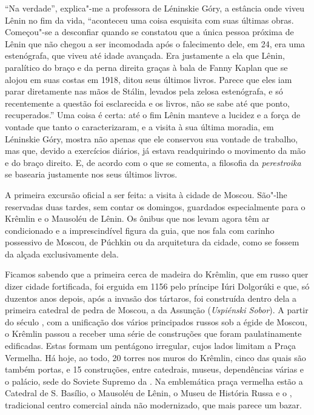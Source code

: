 ``Na verdade'', explica"-me a professora de Léninskie Góry, a estância onde viveu Lênin no fim da vida, ``aconteceu uma coisa esquisita com suas últimas obras. Começou"-se a desconfiar quando se constatou que a única pessoa próxima de Lênin que não chegou a ser incomodada após o falecimento dele, em 24, era uma estenógrafa, que viveu até idade avançada. Era justamente a ela que Lênin, paralítico do braço e da perna direita graças à bala de Fanny Kaplan que se alojou em suas costas em 1918, ditou seus últimos livros. Parece que eles iam parar diretamente nas mãos de Stálin, levados pela zelosa estenógrafa, e só recentemente a questão foi esclarecida e os livros, não se sabe até que ponto, recuperados.'' Uma coisa é certa: até o fim Lênin manteve a lucidez e a força de vontade que tanto o caracterizaram, e a visita à sua última moradia, em Léninskie Góry, mostra não apenas que ele conservou sua vontade de trabalho, mas que, devido a exercícios diários, já estava readquirindo o movimento da mão e do braço direito. E, de acordo com o que se comenta, a filosofia da \emph{perestroika} se basearia justamente nos seus últimos livros.

A primeira excursão oficial a ser feita: a visita à cidade de Moscou. São"-lhe reservadas duas tardes, sem contar os domingos, guardados especialmente para o Krêmlin e o Mausoléu de Lênin. Os ônibus que nos levam agora têm ar condicionado e a imprescindível figura da guia, que nos fala com carinho possessivo de Moscou, de Púchkin ou da arquitetura da cidade, como se fossem da alçada exclusivamente dela.

Ficamos sabendo que a primeira cerca de madeira do Krêmlin, que em russo quer dizer cidade fortificada, foi erguida em 1156 pelo príncipe Iúri Dolgorúki e que, só duzentos anos depois, após a invasão dos tártaros, foi construída dentro dela a primeira catedral de pedra de Moscou, a da Assunção (\emph{Uspiénski Sobor}). A partir do século , com a unificação dos vários principados russos sob a égide de Moscou, o Krêmlin passou a receber uma série de construções que foram paulatinamente edificadas. Estas formam um pentágono irregular, cujos lados limitam a Praça Vermelha. Há hoje, ao todo, 20 torres nos muros do Krêmlin, cinco das quais são também portas, e 15 construções, entre catedrais, museus, dependências várias e o palácio, sede do Soviete Supremo da . Na emblemática praça vermelha estão a Catedral de S. Basílio, o Mausoléu de Lênin, o Museu de História Russa e o , tradicional centro comercial ainda não modernizado, que mais parece um bazar.

